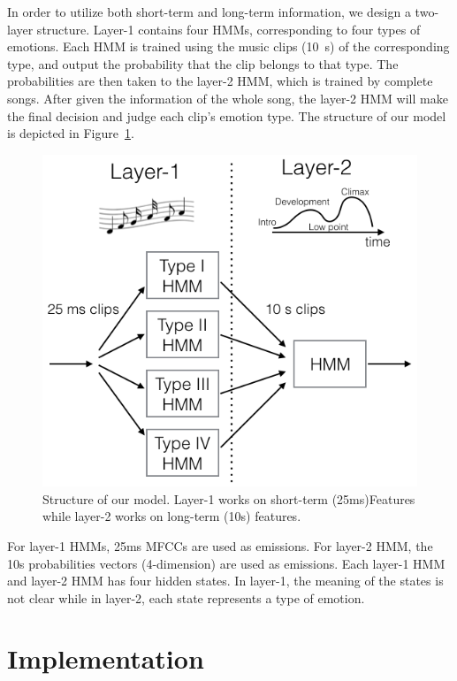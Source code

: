 \documentclass{IEEEtran}
\begin{document}
  In order to utilize both short-term and long-term information, we design a
  two-layer structure. Layer-1 contains four HMMs, corresponding to four types
  of emotions. Each HMM is trained using the music clips (10~s) of the
  corresponding type, and output the probability that the clip belongs to that
  type. The probabilities are then taken to the layer-2 HMM, which is trained
  by complete songs. After given the information of the whole song, the
  layer-2 HMM will make the final decision and judge each clip's emotion type.
  The structure of our model is depicted in Figure~\ref{fig:structure}.

  \begin{figure}[htbp]
    \centering
    \includegraphics[width=\columnwidth]{structure.png}
    \caption{Structure of our model. Layer-1 works on short-term (25ms)Features while layer-2 works on long-term (10s) features.}
    \label{fig:structure}
  \end{figure}

  For layer-1 HMMs, 25ms MFCCs are used as emissions. For layer-2 HMM, the
  10s probabilities vectors (4-dimension) are used as emissions. Each layer-1
  HMM and layer-2 HMM has four hidden states. In layer-1, the meaning of the
  states is not clear while in layer-2, each state represents a type of
  emotion.

  \section{Implementation}
  \label{sec:Implementation}
\end{document}
